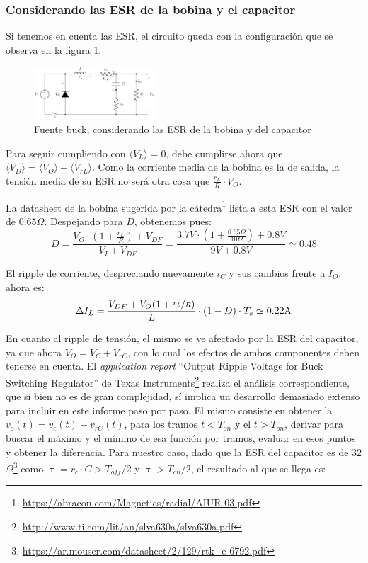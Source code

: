 \documentclass[e4_tp1_main.tex]{subfiles}
\begin{document}
\subsubsection{Considerando las ESR de la bobina y el capacitor}

Si tenemos en cuenta las ESR, el circuito queda con la configuraci\'on que se observa en la figura \ref{fig:buck-esrs}.

\begin{figure}
	\centering
	\includegraphics[width=0.4\textwidth]{images/ej2/buck_esrs.pdf}
	\caption{Fuente buck, considerando las ESR de la bobina y del capacitor}
	\label{fig:buck-esrs}
\end{figure}


Para seguir cumpliendo con $\langle V_L \rangle = 0$, debe cumplirse ahora que $\langle V_D \rangle = \langle V_O \rangle + \langle V_{rL} \rangle$. Como la corriente media de la bobina es la de salida, la tensi\'on media de su ESR no ser\'a otra cosa que $\frac{r_L}{R} \cdot V_O$. 

La datasheet de la bobina sugerida por la 
c\'atedra\footnote{
	\url{https://abracon.com/Magnetics/radial/AIUR-03.pdf}
} lista a esta ESR con el valor de 0.65$\Omega$.
Despejando para $D$, obtenemos pues:
\begin{equation}
	D = \frac{V_O \cdot \left( 1+ \frac{r_L}{R}\right)+ V_{DF}}{V_I + V_{DF}} 
= \frac{3.7V \cdot \left( 1+ \frac{0.65\Omega}{10\Omega}\right) + 0.8V}{9V + 0.8V} 
\simeq 0.48 
\end{equation}


El ripple de corriente, despreciando nuevamente $i_C$ y sus cambios frente a $I_O$, ahora es:
\begin{equation}
	\Delta I_L = \frac{V_{DF} + V_O(1+\nicefrac{r_L}{R})}{L} \cdot (1-D) \cdot T_s \simeq 0.22\text{A} 
\end{equation}

En cuanto al ripple de tensi\'on, el mismo se ve afectado por la ESR del capacitor, ya que ahora $V_O = V_C + V_{rC}$, con lo cual los efectos de ambos componentes deben tenerse en cuenta. El \textit{application report} ``Output Ripple Voltage for Buck Switching Regulator'' de Texas Instruments\footnote{ 
	\url{http://www.ti.com/lit/an/slva630a/slva630a.pdf}
} realiza el an\'alisis correspondiente, que si bien no es de gran complejidad, s\'i implica un desarrollo demasiado extenso para incluir en este informe paso por paso. El mismo consiste en obtener la $v_o(t) = v_c(t) + v_{rC}(t)$, para los tramos $t<T_{on}$ y el $t>T_{on}$, derivar para buscar el m\'aximo y el m\'inimo de esa funci\'on por tramos, evaluar en esos puntos y obtener la diferencia. Para nuestro caso, dado que la ESR del capacitor es de 32$\Omega$\footnote{ 
\url{https://ar.mouser.com/datasheet/2/129/rtk_e-6792.pdf}
} como $\uptau = r_c \cdot C > T_{off}/2$ y $\uptau > T_{on}/2$, el resultado al que se llega es: 
\end{document}

